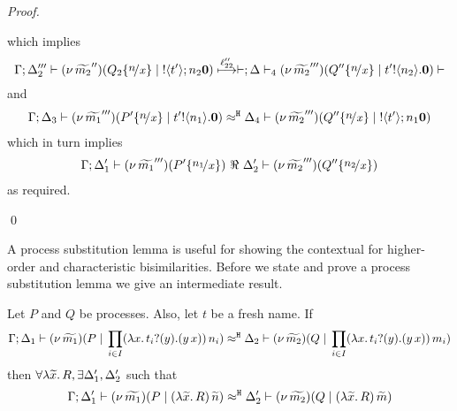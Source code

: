 \begin{proof}
\begin{enumerate}
\begin{itemize}
\begin{itemize}
\[										\]
										which implies
										\[
											\horel{\Gamma}{\Delta_2'''}{\newsp{\widetilde{m_2}''}{Q_2 \subst{n}{x} \Par \btout{t'}{n_2} \inact}}
											{\hby{\ell_{22}''}}
											\horel{\Delta_4}{\newsp{\widetilde{m_2}'''}{Q'' \subst{n}{x} \Par \bout{t'}{n_2} \inact}}
										\]
										and
										\begin{eqnarray*}
											\horel{\Gamma}{\Delta_3}{\newsp{\widetilde{m_1}'''}{P' \subst{n}{x} \Par \bout{t'}{n_1} \inact}}
											{\hwb}
											{\Delta_4}{\newsp{\widetilde{m_2}'''}{Q'' \subst{n}{x} \Par \btout{t'}{n_1} \inact}}
										\end{eqnarray*}
										which in turn implies
										\begin{eqnarray*}
											\horel{\Gamma}{\Delta_1'}{\newsp{\widetilde{m_1}'''}{P' \subst{n_1}{x}}}
											{\ \Re\ }
											{\Delta_2'}{\newsp{\widetilde{m_2}'''}{Q'' \subst{n_2}{x}}}
										\end{eqnarray*}
										as required.
							\end{itemize}
					\end{itemize}
	\end{enumerate}
	\qed
\end{proof}

A process substitution lemma is useful for showing the
contextual for higher-order and characteristic bisimilarities.
Before we state and prove a process substitution lemma
we give an intermediate result.

\begin{lemma}
	\label{lem:trigger_subst}
	Let $P$ and $Q$ be processes. Also, let $t$ be a fresh name. If
	\[
		\Gamma; \Delta_1 \vdash (\nu\, \widetilde{m_1})(P \;|\; \prod_{i \in I} (\lambda x.\,t_i ? (y) . (y\, {x}))\, {n_i} ) \approx^\mathtt{H} \Delta_2 \vdash (\nu\, \widetilde{m_2})(Q \;|\;\prod_{i \in I} (\lambda x.\,t_i ? (y) . (y\, {x}))\, {m_i} )
	\]
	then $\forall \lambda \widetilde{x}.\,R, \exists \Delta_1', \Delta_2'$ such that
	\[
		\Gamma; \Delta_1' \vdash (\nu\, \widetilde{m_1})(P \;|\; (\lambda \widetilde{x}.\,R)\, {\widetilde{n}} ) \approx^\mathtt{H} \Delta_2' \vdash (\nu\, \widetilde{m_2})(Q \;|\; (\lambda \widetilde{x}.\,R)\, {\widetilde{m}} )
	\]
\end{lemma}

